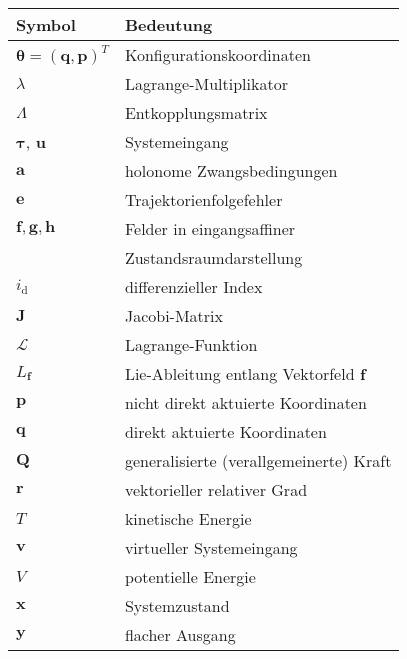 \begin{table}[htbp]%
	\centering
	\begin{tabular}{ l l } 
		\toprule
		Symbol & Bedeutung \\ 
		\hline
		$\boldsymbol{\theta} = (\mathbf{q}, \mathbf{p})^T$ & Konfigurationskoordinaten \\
		$\lambda$ & Lagrange-Multiplikator \\
		$\Lambda$ & Entkopplungsmatrix \\
		$\boldsymbol{\tau}$, $\mathbf{u}$ & Systemeingang \\
		$\mathbf{a}$ & holonome Zwangsbedingungen \\
		$\mathbf{e}$ & Trajektorienfolgefehler \\
		$\mathbf{f}, \mathbf{g}, \mathbf{h}$ & Felder in eingangsaffiner\\
		& Zustandsraumdarstellung\\
		$i_{\mathrm{d}}$ & differenzieller Index \\
		$\mathbf{J}$ & Jacobi-Matrix \\
		$\mathcal{L}$ & Lagrange-Funktion \\
		$L_{\mathbf{f}}$ & Lie-Ableitung entlang Vektorfeld $\mathbf{f}$\\
		$\mathbf{p}$ & nicht direkt aktuierte Koordinaten \\
		$\mathbf{q}$ & direkt aktuierte Koordinaten \\
		$\mathbf{Q}$ & generalisierte (verallgemeinerte) Kraft\\
		$\mathbf{r}$ & vektorieller relativer Grad \\
		$T$ & kinetische Energie \\
		$\mathbf{v}$ & virtueller Systemeingang \\
		$V$ & potentielle Energie \\
		$\mathbf{x}$ & Systemzustand \\
		$\mathbf{y}$ & flacher Ausgang \\
		\bottomrule
	\end{tabular}
\end{table}